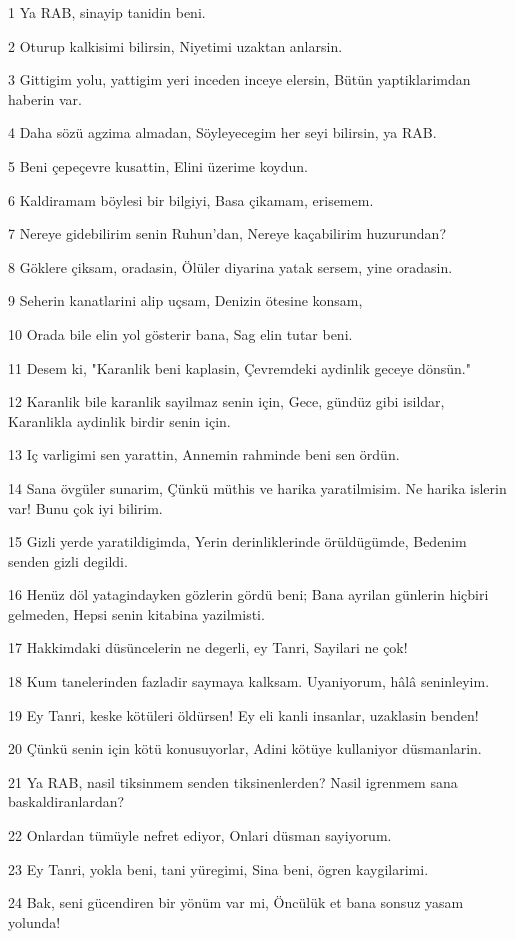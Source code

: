 \par 1 Ya RAB, sinayip tanidin beni.
\par 2 Oturup kalkisimi bilirsin, Niyetimi uzaktan anlarsin.
\par 3 Gittigim yolu, yattigim yeri inceden inceye elersin, Bütün yaptiklarimdan haberin var.
\par 4 Daha sözü agzima almadan, Söyleyecegim her seyi bilirsin, ya RAB.
\par 5 Beni çepeçevre kusattin, Elini üzerime koydun.
\par 6 Kaldiramam böylesi bir bilgiyi, Basa çikamam, erisemem.
\par 7 Nereye gidebilirim senin Ruhun'dan, Nereye kaçabilirim huzurundan?
\par 8 Göklere çiksam, oradasin, Ölüler diyarina yatak sersem, yine oradasin.
\par 9 Seherin kanatlarini alip uçsam, Denizin ötesine konsam,
\par 10 Orada bile elin yol gösterir bana, Sag elin tutar beni.
\par 11 Desem ki, "Karanlik beni kaplasin, Çevremdeki aydinlik geceye dönsün."
\par 12 Karanlik bile karanlik sayilmaz senin için, Gece, gündüz gibi isildar, Karanlikla aydinlik birdir senin için.
\par 13 Iç varligimi sen yarattin, Annemin rahminde beni sen ördün.
\par 14 Sana övgüler sunarim, Çünkü müthis ve harika yaratilmisim. Ne harika islerin var! Bunu çok iyi bilirim.
\par 15 Gizli yerde yaratildigimda, Yerin derinliklerinde örüldügümde, Bedenim senden gizli degildi.
\par 16 Henüz döl yatagindayken gözlerin gördü beni; Bana ayrilan günlerin hiçbiri gelmeden, Hepsi senin kitabina yazilmisti.
\par 17 Hakkimdaki düsüncelerin ne degerli, ey Tanri, Sayilari ne çok!
\par 18 Kum tanelerinden fazladir saymaya kalksam. Uyaniyorum, hâlâ seninleyim.
\par 19 Ey Tanri, keske kötüleri öldürsen! Ey eli kanli insanlar, uzaklasin benden!
\par 20 Çünkü senin için kötü konusuyorlar, Adini kötüye kullaniyor düsmanlarin.
\par 21 Ya RAB, nasil tiksinmem senden tiksinenlerden? Nasil igrenmem sana baskaldiranlardan?
\par 22 Onlardan tümüyle nefret ediyor, Onlari düsman sayiyorum.
\par 23 Ey Tanri, yokla beni, tani yüregimi, Sina beni, ögren kaygilarimi.
\par 24 Bak, seni gücendiren bir yönüm var mi, Öncülük et bana sonsuz yasam yolunda!

